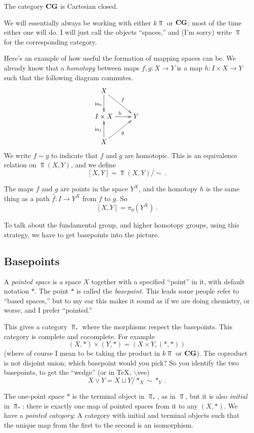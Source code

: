 \begin{corollary}
The category $\mathbf{CG}$ is Cartesian closed.
\end{corollary}

We will essentially always be working with either $k\Top$ or $\mathbf{CG}$; 
most of the time either one will do. I will just call the objects ``spaces,''
and (I'm sorry) write $\Top$ for the corresponding category.

Here's an example of how useful the formation of mapping spaces can be. 
We already know that a {\em homotopy} between maps $f,g:X\to Y$ is a map 
$h:I\times X\to Y$ such that the following diagram commutes.
\begin{equation*}
    \xymatrix{
X\ar[d]_{\inc_0}\ar[dr]^f & &\\
I\times X\ar[r]^h & Y\\
X\ar[u]^{\inc_1}\ar[ur]_g & &
    }
\end{equation*}
We write $f\sim g$ to indicate that $f$ and $g$ are homotopic. This is an
equivalence relation on $\Top(X,Y)$, and 
we define 
\[
[X,Y]=\Top(X,Y)/\sim\,.
\]

The maps $f$ and $g$ are points in the space $Y^X$, and the homotopy $h$ 
is the same thing as a path $\hat f:I\to Y^X$ from $f$ to $g$. So
\[
[X,Y]=\pi_0(Y^X)\,.
\]

To talk about the fundamental group, and higher homotopy groups, using
this strategy, we have to get basepoints into the picture.

\subsection{Basepoints}
A {\em pointed space} is a space $X$ together with a specified ``point'' 
in it, with default notation $*$. The point $\ast$ is called the 
{\em basepoint}. This leads some people refer to ``based spaces,'' but 
to my ear this makes it sound as if we are doing chemistry, or worse, 
and I prefer ``pointed.'' 
 
This gives a category $\Top_\ast$ where the morphisms respect the basepoints. 
This category is complete and cocomplete. For example
\[
(X,\ast)\times (Y,\ast)=(X\times Y,(\ast,\ast))
\]
(where of course I mean to be taking the product in $k\Top$ or $\mathbf{CG}$).
The coproduct is not disjoint union; which basepoint would you pick? So you
identify the two basepoints, to get the ``wedge'' (or in TeX, $\backslash$vee)
\[
X\vee Y=X\sqcup Y/\ast_X\sim \ast_Y\,.
\]

The one-point space $\ast$ is the terminal object in $\Top_*$, as in $\Top$, 
but it is also {\em initial} in $\Top_*$: 
there is exactly one map of pointed spaces from it to 
any $(X,\ast)$. We have a {\em pointed category}: 
A category with initial and terminal objects such that the 
unique map from the first to the second is an isomorphism.

